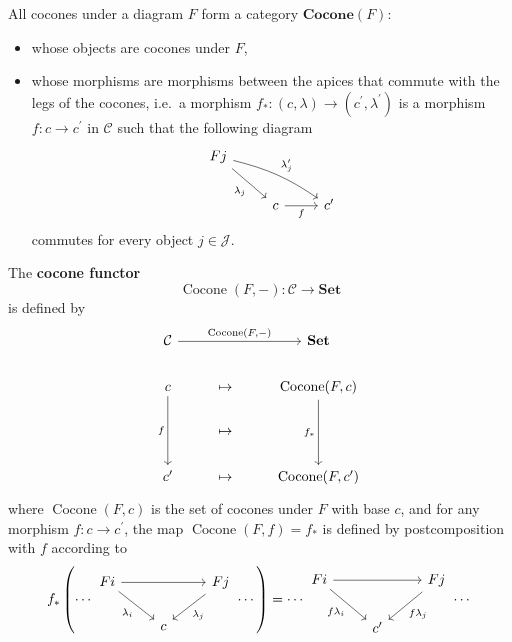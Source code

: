 \documentclass[12pt, oneside]{book}
\begin{document}
\begin{definition}
    All cocones under a diagram $F$ form a category $\mathbf{Cocone}(F)$:
    \begin{itemize}
        \item
              whose objects are cocones under $F$,
        \item
              whose morphisms are morphisms between the apices that commute with the legs of the cocones, i.e.\ a morphism
              $f_*:\left(c,\lambda\right)\to \left(c^\prime,\lambda^\prime\right)$
              is a morphism $f:c\to c^\prime$ in $\mathcal{C}$ such that the following diagram
              \begin{equation*}
                  \begin{tikzcd}
                      Fj\arrow[rd,"\lambda_j"']\arrow[rrd,bend left=10,"\lambda_j'"]& &\\
                      &c\arrow[r,"f"']&c^\prime
                  \end{tikzcd}
              \end{equation*}
              commutes for every object $j\in\mathcal{J}$.
    \end{itemize}
\end{definition}



\begin{definition}
    The \textbf{cocone functor}
    \[
        \operatorname{Cocone}(F,-): \mathcal{C} \to \mathbf{Set}
    \]
    is defined by
    \begin{equation*}
        \begin{tikzcd}
            \mathcal{C} \arrow[rr, "{\operatorname{Cocone}(F,-)}"] & & \mathbf{Set} \\
            c \arrow[dd,"f"'] & \mapsto & \operatorname{Cocone}(F,c) \arrow[dd,"f_*"']\\
            &\mapsto & \\
            c^\prime& \mapsto & \operatorname{Cocone}(F,c^\prime)
        \end{tikzcd}
    \end{equation*}
    where $\operatorname{Cocone}(F,c)$ is the set of cocones under $F$ with base $c$,
    and for any morphism $f:  c\rightarrow c^{\prime}$, the map $\operatorname{Cocone}(F,f)=f_*$ is defined by postcomposition with $f$ according to
    \begin{equation*}
        f_*\left(\cdots
        \begin{tikzcd}
            Fi\arrow[rr,""]\arrow[rd,"\lambda_i"']&&Fj\arrow[ld,"\lambda_j"]\\
            &c&
        \end{tikzcd}
        \cdots\right)
        =\cdots
        \begin{tikzcd}
            Fi\arrow[rr,""]\arrow[rd,"f\lambda_i"']&&Fj\arrow[ld,"f\lambda_j"]\\
            &c^\prime&
        \end{tikzcd}
        \cdots
    \end{equation*}
\end{definition}
\end{document}
